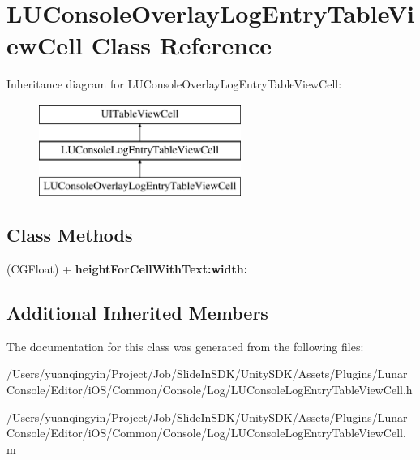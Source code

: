 \hypertarget{interface_l_u_console_overlay_log_entry_table_view_cell}{}\section{L\+U\+Console\+Overlay\+Log\+Entry\+Table\+View\+Cell Class Reference}
\label{interface_l_u_console_overlay_log_entry_table_view_cell}
Inheritance diagram for L\+U\+Console\+Overlay\+Log\+Entry\+Table\+View\+Cell\+:\begin{figure}[H]
\begin{center}
\leavevmode
\includegraphics[height=3.000000cm]{interface_l_u_console_overlay_log_entry_table_view_cell}
\end{center}
\end{figure}
\subsection*{Class Methods}
\begin{DoxyCompactItemize}
\item 
\mbox{\label{interface_l_u_console_overlay_log_entry_table_view_cell_a8b6da267f5ded8f342dd45c9de9f5e9f}} 
(C\+G\+Float) + {\bfseries height\+For\+Cell\+With\+Text\+:width\+:}
\end{DoxyCompactItemize}
\subsection*{Additional Inherited Members}


The documentation for this class was generated from the following files\+:\begin{DoxyCompactItemize}
\item 
/\+Users/yuanqingyin/\+Project/\+Job/\+Slide\+In\+S\+D\+K/\+Unity\+S\+D\+K/\+Assets/\+Plugins/\+Lunar\+Console/\+Editor/i\+O\+S/\+Common/\+Console/\+Log/L\+U\+Console\+Log\+Entry\+Table\+View\+Cell.\+h\item 
/\+Users/yuanqingyin/\+Project/\+Job/\+Slide\+In\+S\+D\+K/\+Unity\+S\+D\+K/\+Assets/\+Plugins/\+Lunar\+Console/\+Editor/i\+O\+S/\+Common/\+Console/\+Log/L\+U\+Console\+Log\+Entry\+Table\+View\+Cell.\+m\end{DoxyCompactItemize}
